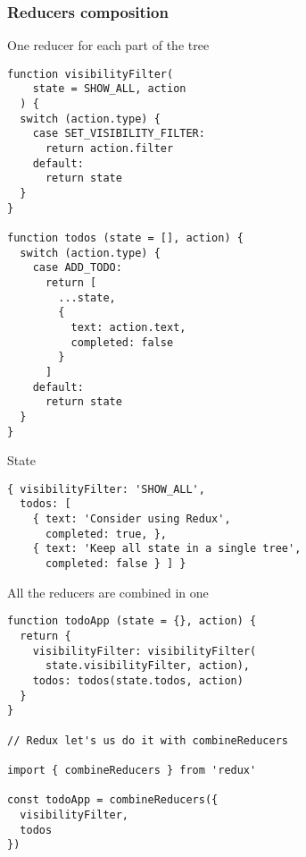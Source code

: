 \begin{frame}[fragile]
  \frametitle{Reducers composition}
  \begin{multicols}{2}
    \scriptsize One reducer for each part of the tree
    \begin{verbatim}
function visibilityFilter(
    state = SHOW_ALL, action
  ) {
  switch (action.type) {
    case SET_VISIBILITY_FILTER:
      return action.filter
    default:
      return state
  }
}

function todos (state = [], action) {
  switch (action.type) {
    case ADD_TODO:
      return [
        ...state,
        {
          text: action.text,
          completed: false
        }
      ]
    default:
      return state
  }
}
    \end{verbatim}

  \columnbreak

    \scriptsize State 
    \begin{verbatim}
{ visibilityFilter: 'SHOW_ALL',
  todos: [
    { text: 'Consider using Redux',
      completed: true, },
    { text: 'Keep all state in a single tree',
      completed: false } ] }

    \end{verbatim}

    \scriptsize All the reducers are combined in one
    \begin{verbatim}
function todoApp (state = {}, action) {
  return {
    visibilityFilter: visibilityFilter(
      state.visibilityFilter, action),
    todos: todos(state.todos, action)
  }
}

// Redux let's us do it with combineReducers

import { combineReducers } from 'redux'

const todoApp = combineReducers({
  visibilityFilter,
  todos
})
    \end{verbatim}

  \end{multicols}
\end{frame}

